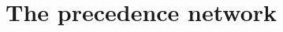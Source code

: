 \documentclass[../report.tex]{subfiles}
\begin{document}
\section{The precedence network}
\end{document}
